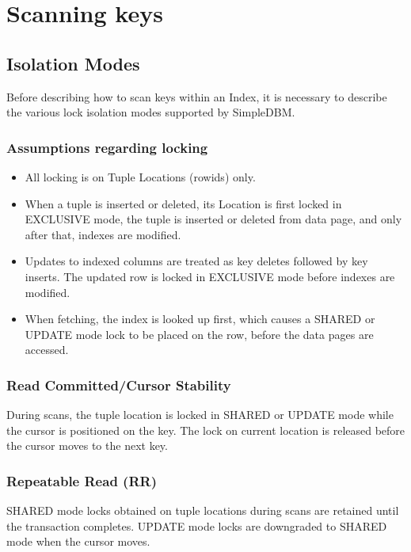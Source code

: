 \documentclass[a4paper,draft,oneside]{book}
\begin{document}
\section{Scanning keys}

\subsection{Isolation Modes}

Before describing how to scan keys within an Index, it is necessary to
describe the various lock isolation modes supported by SimpleDBM.

\subsubsection{Assumptions regarding locking}

\begin{itemize}
\item All locking is on Tuple Locations (rowids) only.
\item When a tuple is inserted or deleted, its Location is first
  locked in EXCLUSIVE mode, the tuple is inserted or deleted from data
  page, and only after that, indexes are modified.
\item Updates to indexed columns are treated as key deletes followed
  by key inserts. The updated row is locked in EXCLUSIVE mode before
  indexes are modified.
\item When fetching, the index is looked up first, which causes a
  SHARED or UPDATE mode lock to be placed on the row, before the data
  pages are accessed.
\end{itemize}

\subsubsection{Read Committed/Cursor Stability}

During scans, the tuple location is locked in SHARED or UPDATE mode
while the cursor is positioned on the key. The lock on current
location is released before the cursor moves to the next key.

\subsubsection{Repeatable Read (RR)}

SHARED mode locks obtained on tuple locations during scans are retained until
the transaction completes. UPDATE mode locks are downgraded to SHARED mode when
the cursor moves.
\end{document}
